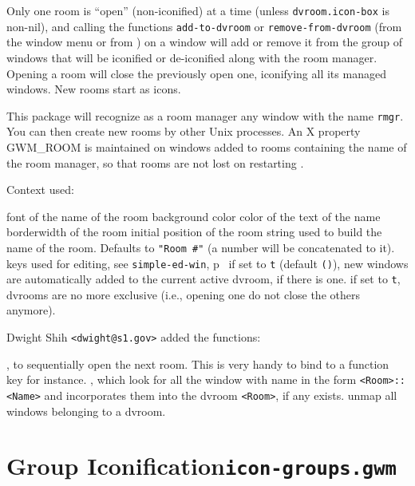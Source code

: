 Only one room is ``open'' (non-iconified) at a time (unless
\verb|dvroom.icon-box| is non-nil), and calling the
functions \verb"add-to-dvroom" or \verb"remove-from-dvroom" (from the
window menu or from {\WOOL}) on a window will add or remove it from the group
of windows that will be iconified or de-iconified along with the room manager.
Opening a room will close the previously open one, iconifying all its managed
windows. New rooms start as icons.

This package will recognize as a room manager any window with the name 
\verb"rmgr". You can then create new rooms by other Unix processes.
An X property GWM\_ROOM is maintained on windows added to rooms containing the
name of the room manager, so that rooms are not lost on restarting {\GWM}.

Context used:
\begin{description}
 font of the name of the room
 background color
 color of the text of the name
 borderwidth of the room
 initial position of the room
 string used to build the name of the room. Defaults
to \verb|"Room #"| (a number will be concatenated to it).
 keys used
for editing, see \verb"simple-ed-win", p~\pageref{simple-ed-win}
 if set to \verb|t| (default \verb|()|), new windows
are automatically added to the current active dvroom, if there is one.
 if set to \verb|t|, dvrooms are no more exclusive
(i.e., opening one do not close the others anymore).
\end{description}

Dwight Shih \verb|<dwight@s1.gov>| added the functions:
\begin{description}
, to sequentially open the next room.
This is very handy to bind to a function key for instance.
, which look for all the window with name in the
form \verb|<Room>::<Name>| and incorporates them into the dvroom
\verb|<Room>|, if any exists.
 unmap all windows belonging to a dvroom.
\end{description}

\section{Group Iconification\hfill{\tt icon-groups.gwm}}
\label{icon-groups}

